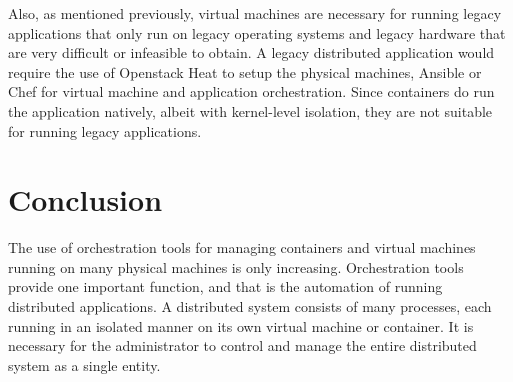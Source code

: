 \documentclass[10pt,twocolumn]{article}
\begin{document}
Also, as mentioned previously, virtual machines are necessary for running legacy applications that only run on legacy operating systems and legacy hardware that are very difficult or infeasible to obtain.
A legacy distributed application would require the use of Openstack Heat to setup the physical machines, Ansible or Chef for virtual machine and application orchestration.
Since containers do run the application natively, albeit with kernel-level isolation, they are not suitable for running legacy applications.

\section{Conclusion}

The use of orchestration tools for managing containers and virtual machines running on many physical machines is only increasing.
Orchestration tools provide one important function, and that is the automation of running distributed applications.
A distributed system consists of many processes, each running in an isolated manner on its own virtual machine or container.
It is necessary for the administrator to control and manage the entire distributed system as a single entity.



\end{document}
